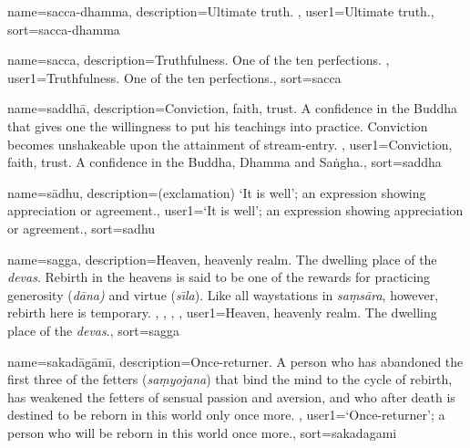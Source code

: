 {
name=sacca-dhamma,
description={Ultimate truth. \protect \seepre %
\protect {}%
\protect \seepost %
},
user1={Ultimate truth.},
sort={sacca-dhamma}
}

{
name={sacca},
description={Truthfulness. One of the ten perfections. \protect \seepre %
\protect {}%
\protect \seepost %
},
user1={Truthfulness. One of the ten perfections.},
sort={sacca}
}

{
name={saddh\=a},
description={Conviction, faith, trust. A confidence in the Buddha that gives one the willingness to put his teachings into practice. Conviction becomes unshakeable upon the attainment of stream-entry. \protect \seepre %
\protect {}%
\protect \seepost %
},
user1={Conviction, faith, trust. A confidence in the Buddha, Dhamma and Sa\.ngha.},
sort={saddha}
}

{
name={s\=adhu},
description={(exclamation) `It is well'; an expression showing appreciation or agreement.},
user1={`It is well'; an expression showing appreciation or agreement.},
sort={sadhu}
}

{
name={sagga},
description={Heaven, heavenly realm. The dwelling place of the \textit{devas}. Rebirth in the heavens is said to be one of the rewards for practicing generosity (\textit{d\=ana)} and virtue (\textit{s\={\i}la}). Like all waystations in \textit{sa\d{m}s\=ara}, however, rebirth here is temporary. \protect \seepre %
\protect {}, \protect {}, \protect {}, \protect {}%
\protect \seepost %
},
user1={Heaven, heavenly realm. The dwelling place of the \textit{devas}.},
sort={sagga}
}

{
name={sakad\=ag\=am\={\i}},
description={Once-returner. A person who has abandoned the first three of the fetters (\textit{sa\d{m}yojana}) that bind the mind to the cycle of rebirth, has weakened the fetters of sensual passion and aversion, and who after death is destined to be reborn in this world only once more. \protect \seepre %
\protect {}%
\protect \seepost %
},
user1={`Once-returner'; a person who will be reborn in this world once more.},
sort={sakadagami}
}

